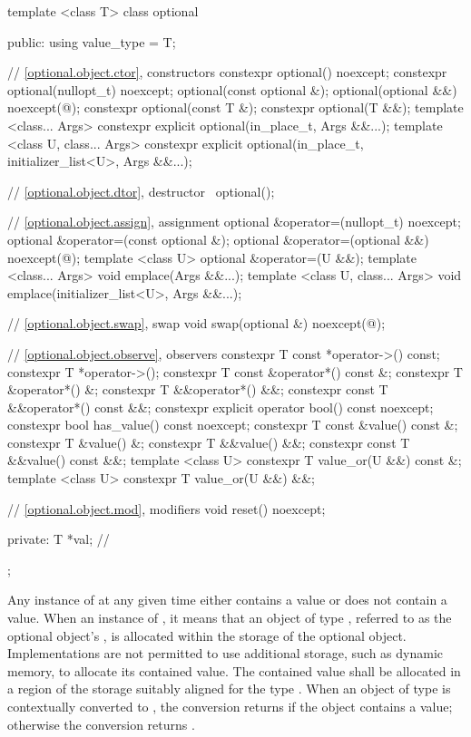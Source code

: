 %
\begin{codeblock}
template <class T> class optional {
public:
  using value_type = T;

  // \ref{optional.object.ctor}, constructors
  constexpr optional() noexcept;
  constexpr optional(nullopt_t) noexcept;
  optional(const optional &);
  optional(optional &&) noexcept(@\seebelow@);
  constexpr optional(const T &);
  constexpr optional(T &&);
  template <class... Args> constexpr explicit optional(in_place_t, Args &&...);
  template <class U, class... Args>
    constexpr explicit optional(in_place_t, initializer_list<U>, Args &&...);

  // \ref{optional.object.dtor}, destructor
  ~optional();

  // \ref{optional.object.assign}, assignment
  optional &operator=(nullopt_t) noexcept;
  optional &operator=(const optional &);
  optional &operator=(optional &&) noexcept(@\seebelow@);
  template <class U> optional &operator=(U &&);
  template <class... Args> void emplace(Args &&...);
  template <class U, class... Args>
    void emplace(initializer_list<U>, Args &&...);

  // \ref{optional.object.swap}, swap
  void swap(optional &) noexcept(@\seebelow@);

  // \ref{optional.object.observe}, observers
  constexpr T const *operator->() const;
  constexpr T *operator->();
  constexpr T const &operator*() const &;
  constexpr T &operator*() &;
  constexpr T &&operator*() &&;
  constexpr const T &&operator*() const &&;
  constexpr explicit operator bool() const noexcept;
  constexpr bool has_value() const noexcept;
  constexpr T const &value() const &;
  constexpr T &value() &;
  constexpr T &&value() &&;
  constexpr const T &&value() const &&;
  template <class U> constexpr T value_or(U &&) const &;
  template <class U> constexpr T value_or(U &&) &&;

  // \ref{optional.object.mod}, modifiers
  void reset() noexcept;

private:
  T *val; // \expos
};
\end{codeblock}

\pnum
Any instance of  at any given time either contains a value or does not contain a value.
When an instance of  ,
it means that an object of type , referred to as the optional object's ,
is allocated within the storage of the optional object.
Implementations are not permitted to use additional storage, such as dynamic memory, to allocate its contained value.
The contained value shall be allocated in a region of the  storage suitably aligned for the type .
When an object of type  is contextually converted to ,
the conversion returns  if the object contains a value;
otherwise the conversion returns .

